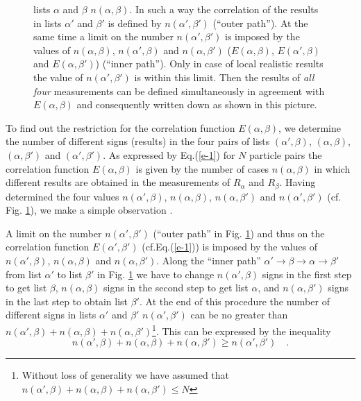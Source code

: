 \begin{figure}
{lists $\alpha$ and $\beta$ $n(\alpha,\beta)$.
In such a way the correlation of the
results in lists $\alpha '$ and $\beta '$ is defined by
$n(\alpha ',\beta ')$ (``outer path'').
At the same time a limit on the number $n(\alpha ',\beta ')$ is imposed
by the values of $n(\alpha,\beta)$, $n(\alpha ',\beta)$ and
$n(\alpha,\beta ')$
($E(\alpha,\beta)$, $E(\alpha ',\beta)$ and $E(\alpha,\beta ')$)
(``inner path'').
Only in case of local realistic results the value of $n(\alpha ',\beta ')$
is within this limit.
Then the results of {\em all four} measurements can be defined
simultaneously in agreement with $E(\alpha,\beta)$ and consequently written
down as shown in this picture.
\label{f-1}}
\end{figure}

To find out the restriction for the correlation function $E(\alpha,\beta)$,
we determine
the number of different signs (results) in the four pairs of lists
$(\alpha ',\beta )$, $(\alpha ,\beta )$, $(\alpha ,\beta ')$ and
$(\alpha ',\beta ')$.
As expressed by Eq.(\ref{e-1})
for $N$ particle pairs the correlation function $E(\alpha,\beta)$ is
given by the number of cases $n(\alpha, \beta)$ in which different results
are obtained in the
measurements of $R_{\alpha}$ and $R_{\beta}$.
Having determined the four values
$n(\alpha ',\beta )$,
$n(\alpha ,\beta )$,
$n(\alpha ,\beta ')$ and
$n(\alpha ',\beta ')$
(cf. Fig. \ref{f-1}), we make a simple observation \cite{krenn}.

A limit on the number $n(\alpha ',\beta ')$
(``outer path'' in Fig. \ref{f-1})
and thus on the correlation function $E(\alpha ',\beta ')$
(cf.Eq.(\ref{e-1}))
is imposed by the
values of $n(\alpha ',\beta )$,
$n(\alpha ,\beta )$ and $n(\alpha ,\beta ')$.
Along the ``inner path''
$\alpha '
\rightarrow
\beta
\rightarrow
\alpha
\rightarrow
\beta  '$
from list $\alpha '$ to list $\beta'$ in Fig. \ref{f-1} we have to
change
$n(\alpha ',\beta )$ signs in the first step to get list $\beta$,
$n(\alpha ,\beta )$ signs in the second step to get list $\alpha$,
and $n(\alpha ,\beta ')$ signs in the last step to obtain list
$\beta '$.
At the end of this procedure the number of different signs in lists
$\alpha '$ and $\beta '$ $n(\alpha ',\beta ')$ can be no greater than
$n(\alpha ',\beta )+
n(\alpha ,\beta )+
n(\alpha ,\beta ')$\footnote{Without loss of generality we have assumed that
$n(\alpha ',\beta )+
n(\alpha ,\beta )+
n(\alpha ,\beta ') \le N$}.
This can be expressed by the inequality
\begin{equation}
n(\alpha ',\beta )+
n(\alpha ,\beta )+
n(\alpha ,\beta ') \ge
n(\alpha ',\beta ')\quad .
\label{e-2}
\end{equation}

